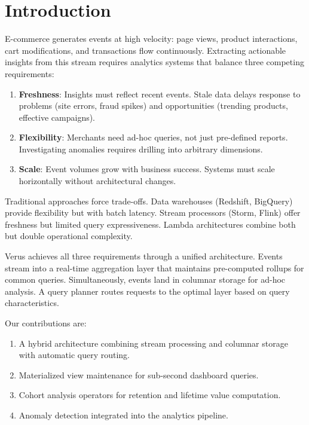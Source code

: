 \section{Introduction}


E-commerce generates events at high velocity: page views, product interactions, cart modifications, and transactions flow continuously. Extracting actionable insights from this stream requires analytics systems that balance three competing requirements:

\begin{enumerate}
\item \textbf{Freshness}: Insights must reflect recent events. Stale data delays response to problems (site errors, fraud spikes) and opportunities (trending products, effective campaigns).
\item \textbf{Flexibility}: Merchants need ad-hoc queries, not just pre-defined reports. Investigating anomalies requires drilling into arbitrary dimensions.
\item \textbf{Scale}: Event volumes grow with business success. Systems must scale horizontally without architectural changes.
\end{enumerate}

Traditional approaches force trade-offs. Data warehouses (Redshift, BigQuery) provide flexibility but with batch latency. Stream processors (Storm, Flink) offer freshness but limited query expressiveness. Lambda architectures \cite{marz2015} combine both but double operational complexity.

Verus achieves all three requirements through a unified architecture. Events stream into a real-time aggregation layer that maintains pre-computed rollups for common queries. Simultaneously, events land in columnar storage for ad-hoc analysis. A query planner routes requests to the optimal layer based on query characteristics.

Our contributions are:
\begin{enumerate}
\item A hybrid architecture combining stream processing and columnar storage with automatic query routing.
\item Materialized view maintenance for sub-second dashboard queries.
\item Cohort analysis operators for retention and lifetime value computation.
\item Anomaly detection integrated into the analytics pipeline.
\end{enumerate}

